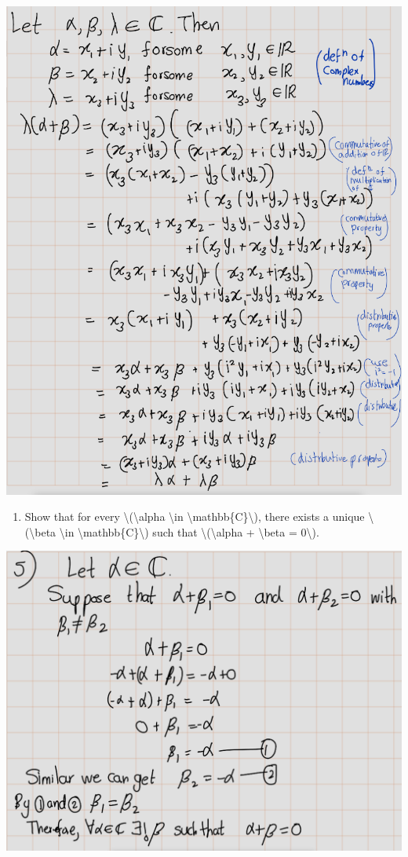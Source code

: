 \documentclass[
]{book}
\providecommand{\tightlist}{%
  \setlength{\itemsep}{0pt}\setlength{\parskip}{0pt}}
\theoremstyle{definition}
\theoremstyle{definition}
\theoremstyle{definition}
\theoremstyle{definition}
\theoremstyle{remark}
\begin{document}
\includegraphics{fig/Ex1A/Ex4.png}

\begin{enumerate}
\def\labelenumi{\arabic{enumi}.}
\setcounter{enumi}{4}
\tightlist
\item
  Show that for every \textbackslash(\textbackslash alpha \textbackslash in \textbackslash mathbb\{C\}\textbackslash), there exists a unique \textbackslash(\textbackslash beta \textbackslash in \textbackslash mathbb\{C\}\textbackslash) such that \textbackslash(\textbackslash alpha + \textbackslash beta = 0\textbackslash).
\end{enumerate}

\includegraphics{fig/Ex1A/Ex5.png}
\end{document}
